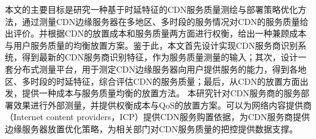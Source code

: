 本文的主要目标是研究一种基于时延特征的CDN服务质量测绘与部署策略优化方法，通过测量CDN边缘服务器在多地区、多时段的服务情况对CDN的服务质量给出评价。并根据CDN的放置成本和服务质量两方面进行权衡，给出一种兼顾成本与用户服务质量的均衡放置方案。鉴于此，本文首先设计实现CDN服务商识别系统，得到最新的CDN服务商识别特征，作为服务质量测量的输入；其次，设计一套分布式测量平台，用于测定CDN边缘服务器向用户提供服务的能力，得到各地区、多时段的时延特征，综合评估CDN的服务质量；最后，从CDN的放置方面出发，提供一种成本与服务质量均衡的放置方法。
本研究针对CDN服务商的服务部署效果进行外部测量，并提供权衡成本与QoS的放置方案。可以为网络内容提供商（Internet content providers，ICP）提供CDN服务购置依据，为CDN服务商提供边缘服务器放置优化策略，为相关部门对CDN服务质量的把控提供数据支撑。







